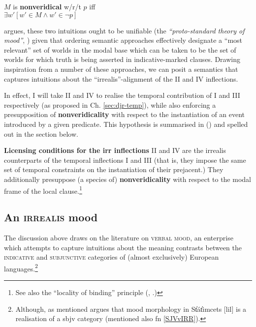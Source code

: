 \pex {}$ \mathit{M} $ is \textbf{nonveridical} w/r/t $ p $ iff\\
$ \exists w' [w'\in\mathit{M}\wedge w'\in\neg p]$
\xe

 \citet[71]{Portner2018a} argues, these two intuitions ought to be unifiable (the \textit{``proto-standard theory of mood''}, \citealp[see also][]{Portner2018,Portner2012}) given that ordering semantic approaches effectively designate a ``most relevant'' set of worlds in the modal base which can be taken to be the set of worlds for which truth is being asserted in indicative-marked clauses. Drawing inspiration from a number of these approaches, we can posit a semantics that captures intuitions about the ``irrealis''-alignment of the \gls{II} and \gls{IV} inflections.


In effect, I will take \gls{II} and \gls{IV} to realise the temporal contribution of \gls{I} and \gls{III} respectively (as proposed in Ch. \ref{sec:djr-temp}), while also enforcing a presupposition of \textbf{nonveridicality} with respect to the instantiation of an event introduced by a given predicate. This hypothesis is summarised in () and spelled out in the section below.

\pex\textbf{Licensing conditions for the \gls{irr} inflections}
\a \gls{II} and \gls{IV} are the irrealis counterparts of the temporal inflections \gls{I} and \gls{III} (that is, they impose the same set of temporal constraints on the instantiation of their prejacent.)
\a They additionally presuppose (a species of) \textbf{nonveridicality} with respect to the modal frame of the local clause.\footnote{See also the ``locality of binding'' principle (\citealp[201]{Percus2000}, 	\citealp[99]{Hacquard2010}.)}
\xe



\subsection{An \textsc{irrealis} mood}


The discussion above draws on the literature on \textsc{verbal mood}, an enterprise which attempts to capture intuitions about the meaning contrasts between the \textsc{indicative} and \textsc{subjunctive} categories of (almost exclusively) European languages.\footnote{Although, as mentioned \citet{Matthewson2010} argues that mood morphology in St̓át̓imcets [\gls{lil}] is a realisation of a \gls{sbjv} category (mentioned also fn \ref{SJVvIRR}).}

